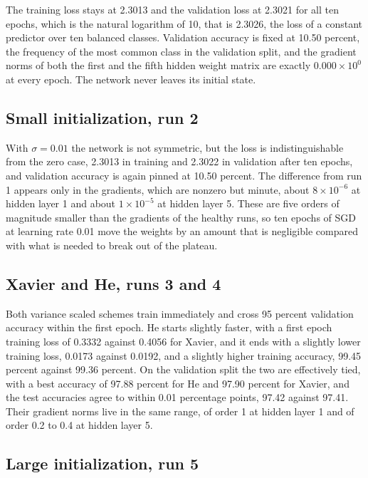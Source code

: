 \documentclass[12pt]{article}
\begin{document}
The training loss stays at 2.3013 and the validation loss at 2.3021 for all ten epochs, which is the natural logarithm of 10, that is 2.3026, the loss of a constant predictor over ten balanced classes. Validation accuracy is fixed at 10.50 percent, the frequency of the most common class in the validation split, and the gradient norms of both the first and the fifth hidden weight matrix are exactly $0.000 \times 10^{0}$ at every epoch. The network never leaves its initial state.

\subsection{Small initialization, run 2}

With $\sigma = 0.01$ the network is not symmetric, but the loss is indistinguishable from the zero case, 2.3013 in training and 2.3022 in validation after ten epochs, and validation accuracy is again pinned at 10.50 percent. The difference from run 1 appears only in the gradients, which are nonzero but minute, about $8 \times 10^{-6}$ at hidden layer 1 and about $1 \times 10^{-5}$ at hidden layer 5. These are five orders of magnitude smaller than the gradients of the healthy runs, so ten epochs of SGD at learning rate 0.01 move the weights by an amount that is negligible compared with what is needed to break out of the plateau.

\subsection{Xavier and He, runs 3 and 4}

Both variance scaled schemes train immediately and cross 95 percent validation accuracy within the first epoch. He starts slightly faster, with a first epoch training loss of 0.3332 against 0.4056 for Xavier, and it ends with a slightly lower training loss, 0.0173 against 0.0192, and a slightly higher training accuracy, 99.45 percent against 99.36 percent. On the validation split the two are effectively tied, with a best accuracy of 97.88 percent for He and 97.90 percent for Xavier, and the test accuracies agree to within 0.01 percentage points, 97.42 against 97.41. Their gradient norms live in the same range, of order 1 at hidden layer 1 and of order 0.2 to 0.4 at hidden layer 5.

\subsection{Large initialization, run 5}
\end{document}
